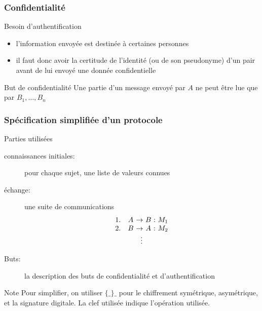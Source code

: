 \begin{reveals}
\begin{frame}
  \vfill


\end{frame}

\begin{frame}
  \frametitle{Confidentialité}

  \vfill

   \begin{block}{Besoin d'authentification}
     \begin{itemize}
     \item l'information envoyée est destinée à certaines personnes
     \item il faut donc avoir la certitude de l'identité (ou de son
       pseudonyme) d'un pair avant de lui envoyé une donnée
       confidentielle
     \end{itemize}
  \end{block}

  \vfill

  \begin{block}{But de confidentialité}
    Une partie d'un message envoyé par \(A\) ne peut être lue que par
    \(B_1,\ldots,B_n\)
  \end{block}

  \vfill
\end{frame}


\begin{frame}
  \frametitle{Spécification simplifiée d'un protocole}

  \vfill

   \begin{block}{Parties utilisées}
     \begin{description}
     \item[connaissances initiales:] pour chaque sujet, une liste de valeurs connues
     \item[échange:] une suite de communications
       \[
         \begin{array}{rc@{~\ensuremath{\rightarrow}~}c@{~:~}l}
         1. & A & B& M_1 \\
         2. & B & A& M_2 \\
           \multicolumn{4}{c}{\ensuremath{\vdots}}\\
         \end{array}
       \]
     \item[Buts:] la description des buts de confidentialité et d'authentification
     \end{description}
  \end{block}

  \vfill
  \begin{block}{Note}
    Pour simplifier, on utiliser \(\lbrace\_\rbrace\_\) pour le
    chiffrement symétrique, asymétrique, et la signature digitale. La
    clef utilisée indique l'opération utilisée.
  \end{block}


\end{frame}
\end{reveals}
